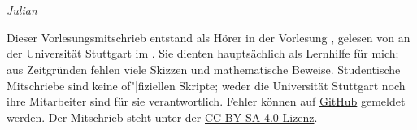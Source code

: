 \part{\vorlesung{}}\par
\thispagestyle{empty}

\emph{Julian }

\vspace*{1em}

Dieser Vorlesungsmitschrieb entstand als Hörer in der Vorlesung \vorlesung{},
gelesen von \dozent{} an der Universität Stuttgart im \semester{}.
Sie dienten hauptsächlich als Lernhilfe für mich;
aus Zeitgründen fehlen viele Skizzen und mathematische Beweise.
Studentische Mitschriebe sind keine of"|fiziellen Skripte;
weder die Universität Stuttgart noch ihre Mitarbeiter sind für sie verantwortlich.
Fehler können auf \href{https://github.com/valentjn/class-notes}{GitHub} gemeldet werden.
Der Mitschrieb steht unter der
\href{https://creativecommons.org/licenses/by-sa/4.0/}{CC-BY-SA-4.0-Lizenz}.

{%
  \renewcommand*{\chaptermarkformat}{}

  \renewcommand*{\contentsname}{Inhaltsverzeichnis dieser Vorlesung}

  \localtableofcontents%
}

\pagebreak
